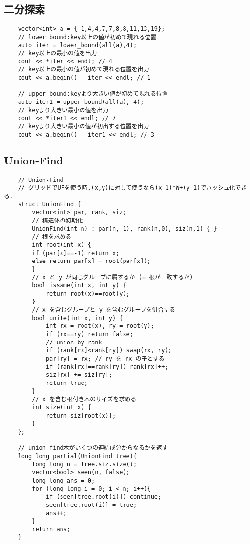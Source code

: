 \documentclass[a4paper, landscape, 9pt]{jarticle} %
\begin{document}
\begin{multicols*}{3}
    \subsection{二分探索}
    \begin{lstlisting}
    vector<int> a = { 1,4,4,7,7,8,8,11,13,19};
    // lower_bound:key以上の値が初めて現れる位置
    auto iter = lower_bound(all(a),4);
    // key以上の最小の値を出力
    cout << *iter << endl; // 4
    // key以上の最小の値が初めて現れる位置を出力
    cout << a.begin() - iter << endl; // 1

    // upper_bound:keyより大きい値が初めて現れる位置
    auto iter1 = upper_bound(all(a), 4);
    // keyより大きい最小の値を出力
    cout << *iter1 << endl; // 7
    // keyより大きい最小の値が初出する位置を出力
    cout << a.begin() - iter1 << endl; // 3

    \end{lstlisting}

    \subsection{Union-Find}
    \begin{lstlisting}
    // Union-Find
    // グリッドでUFを使う時,(x,y)に対して使うなら(x-1)*W+(y-1)でハッシュ化できる．
    struct UnionFind {
        vector<int> par, rank, siz;
        // 構造体の初期化
        UnionFind(int n) : par(n,-1), rank(n,0), siz(n,1) { }
        // 根を求める
        int root(int x) {
        if (par[x]==-1) return x;
        else return par[x] = root(par[x]);
        }
        // x と y が同じグループに属するか (= 根が一致するか)
        bool issame(int x, int y) {
            return root(x)==root(y);
        }
        // x を含むグループと y を含むグループを併合する
        bool unite(int x, int y) {
            int rx = root(x), ry = root(y);
            if (rx==ry) return false;
            // union by rank
            if (rank[rx]<rank[ry]) swap(rx, ry);
            par[ry] = rx; // ry を rx の子とする
            if (rank[rx]==rank[ry]) rank[rx]++;
            siz[rx] += siz[ry];
            return true;
        }
        // x を含む根付き木のサイズを求める
        int size(int x) {
            return siz[root(x)];
        }
    };
    
    // union-find木がいくつの連結成分からなるかを返す
    long long partial(UnionFind tree){
        long long n = tree.siz.size();
        vector<bool> seen(n, false);
        long long ans = 0;
        for (long long i = 0; i < n; i++){
            if (seen[tree.root(i)]) continue;
            seen[tree.root(i)] = true;
            ans++;
        }
        return ans;
    }
    

\end{lstlisting}
\end{multicols*}
\end{document}
